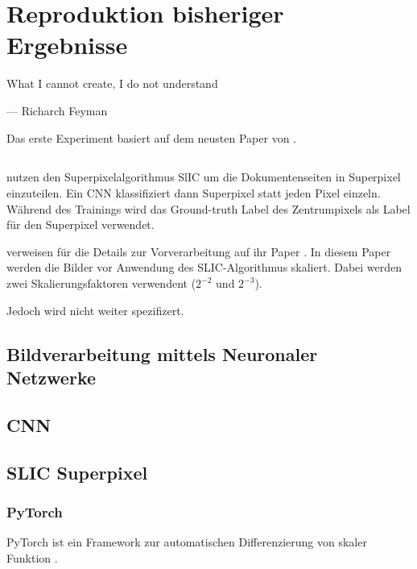 \chapter{Reproduktion bisheriger Ergebnisse}
\label{chap:reproduktion}
\epigraph{What I cannot create, I do not understand}{--- Richarch Feyman}

Das erste Experiment basiert auf dem neusten Paper von \citeauthor{ChenConvolutionalNeuralNetworks2017}. 

\section{\textcite{ChenConvolutionalNeuralNetworks2017}}
\citeauthor{ChenConvolutionalNeuralNetworks2017} nutzen den Superpixelalgorithmus SlIC 
\cite{AchantaSLICSuperpixels2010} um die Dokumentenseiten in Superpixel einzuteilen.
Ein CNN klassifiziert dann Superpixel statt jeden Pixel einzeln.
Während des Trainings wird das Ground-truth Label des Zentrumpixels als Label für den Superpixel verwendet.

\citeauthor{ChenConvolutionalNeuralNetworks2017} verweisen für die Details zur Vorverarbeitung 
auf ihr Paper \cite{ChenPageSegmentationHistorical2016}. 
In diesem Paper werden die Bilder vor Anwendung des SLIC-Algorithmus skaliert.
Dabei werden zwei Skalierungsfaktoren verwendent (\(2^{-2}\text{ und } 2^{-3}\)).
 
Jedoch wird nicht weiter spezifizert.


\section{Bildverarbeitung mittels Neuronaler Netzwerke}
\section{CNN}
\section{SLIC Superpixel}
\cite{AchantaSLICSuperpixels2010}


\subsection{PyTorch}
PyTorch ist ein Framework zur automatischen Differenzierung von skaler Funktion \autocite{PaszkeAutomaticdifferentiationPyTorch2017}.

